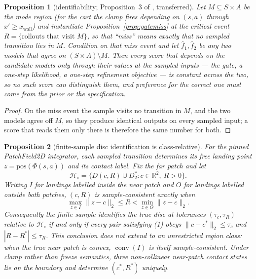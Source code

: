 \documentclass[11pt]{article}
\newtheorem{proposition}{Proposition}
\theoremstyle{definition}
\theoremstyle{remark}
\begin{document}
\begin{proposition}[identifiability; Proposition~3 of \citealp{aguilar2026verified}, transferred]
\label{prop:ident}
Let $M \subseteq S \times A$ be the mode region (for the cart the clamp fires depending on $(s,a)$ through $x' \geq x_{\mathrm{wall}}$) and instantiate Proposition~\ref{prop:gatemiss} at the critical event $R = \{\text{rollouts that visit } M\}$, so that ``miss'' means exactly that no sampled transition lies in $M$. Condition on that miss event and let $\hat f_1, \hat f_2$ be any two models that agree on $(S \times A) \setminus M$. Then every score that depends on the candidate models \emph{only through their values at the sampled inputs} --- the gate, a one-step likelihood, a one-step refinement objective --- is constant across the two, so no such score can distinguish them, and preference for the correct one must come from the prior or the specification.
\end{proposition}

\begin{proof}
On the miss event the sample visits no transition in $M$, and the two models agree off $M$, so they produce identical outputs on every sampled input; a score that reads them only there is therefore the same number for both.
\end{proof}

\begin{proposition}[finite-sample disc identification is class-relative]
\label{prop:discident}
For the pinned PatchField2D integrator, each sampled transition determines its free landing point $z=\mathrm{pos}(\Phi(s,a))$ and its contact label. Fix the far patch and let
\[
  \mathcal H_{\circ}=\{D(c,R)\cup D_2^*:c\in\mathbb R^2,\ R>0\}.
\]
Writing $I$ for landings labelled inside the near patch and $O$ for landings labelled outside both patches, $(c,R)$ is sample-consistent exactly when
\[
  \max_{z\in I}\|z-c\|_2\leq R<\min_{z\in O}\|z-c\|_2.                 \tag{1}
\]
Consequently the finite sample identifies the true disc at tolerances $(\tau_c,\tau_R)$ relative to $\mathcal H_{\circ}$ if and only if every pair satisfying (1) obeys $\|c-c^*\|_2\leq\tau_c$ and $|R-R^*|\leq\tau_R$. This conclusion does not extend to an unrestricted region class: when the true near patch is convex, $\operatorname{conv}(I)$ is itself sample-consistent. Under clamp rather than freeze semantics, three non-collinear near-patch contact states lie on the boundary and determine $(c^*,R^*)$ uniquely.
\end{proposition}
\end{document}
